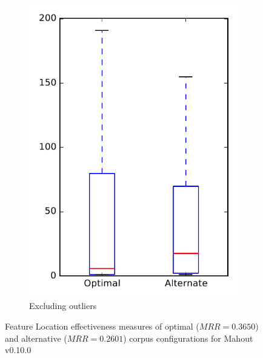 \begin{figure}
\begin{subfigure}{.4\textwidth}
        \includegraphics[height=0.4\textheight]{figures/combo/flt_rq2_mahout_no_outlier}
        \caption{Excluding outliers}\label{fig:combo:flt:rq2:mahout_no_outlier}
    \end{subfigure}
\caption[Feature Location effectiveness measures of optimal and alternative corpus configurations for Mahout v0.10.0]%
{Feature Location effectiveness measures of optimal ($MRR=0.3650$) and alternative ($MRR=0.2601$) corpus configurations for Mahout v0.10.0}
\label{fig:combo:flt:rq2:mahout}
\end{figure}
